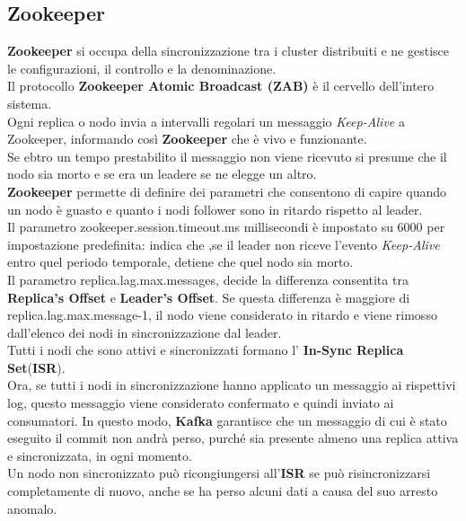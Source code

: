 \documentclass{article}
\begin{document}
\subsection{Zookeeper}
\textbf{Zookeeper} si occupa della sincronizzazione tra i cluster distribuiti e ne gestisce le configurazioni, il controllo e la denominazione.\\
Il protocollo \textbf{Zookeeper Atomic Broadcast (ZAB)} è il cervello dell'intero sistema.\\
Ogni replica o nodo invia a intervalli regolari un messaggio \textit{ Keep-Alive} a Zookeeper, informando così \textbf{Zookeeper} che è vivo e funzionante. \\
Se ebtro un tempo prestabilito il messaggio non viene ricevuto si presume che il nodo sia morto e se era un leadere se ne elegge un altro.\\
\textbf{Zookeeper} permette di definire dei parametri che consentono di capire quando un nodo è guasto e quanto i nodi follower sono in ritardo rispetto al leader.\\
Il parametro zookeeper.session.timeout.ms millisecondi è impostato su 6000 per impostazione predefinita: indica che ,se il leader non riceve l'evento \textit{ Keep-Alive} entro quel periodo temporale, detiene che quel nodo sia morto.\\
Il parametro replica.lag.max.messages, decide la differenza consentita tra \textbf{Replica's Offset
}e \textbf{Leader's Offset}. Se questa differenza è maggiore di replica.lag.max.message-1, il nodo viene considerato in ritardo e viene rimosso dall'elenco dei nodi in sincronizzazione dal leader. \\
Tutti i nodi che sono attivi e sincronizzati formano l' \textbf{In-Sync Replica Set}(\textbf{ISR}).\\
Ora, se tutti i nodi in sincronizzazione hanno applicato un messaggio ai rispettivi log, questo messaggio viene considerato confermato e quindi inviato ai consumatori. In questo modo, \textbf{Kafka} garantisce che un messaggio di cui è stato eseguito il commit non andrà perso, purché sia presente almeno una replica attiva e sincronizzata, in ogni momento.\\
Un nodo non sincronizzato può ricongiungersi all'\textbf{ISR} se può risincronizzarsi completamente di nuovo, anche se ha perso alcuni dati a causa del suo arresto anomalo.
\end{document}
